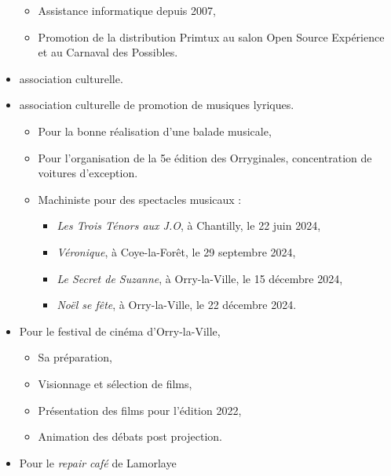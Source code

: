 \begin{itemize}
\begin{itemize}
                \item{Assistance informatique depuis 2007,}
                \item{Promotion de la distribution Primtux au salon Open Source Expérience et au Carnaval des Possibles.}
            \end{itemize}
        \item{ association culturelle.}
        \item{ association culturelle de promotion de musiques lyriques.}
            \begin{itemize}
                \item{Pour la bonne réalisation d'une balade musicale,}
                \item{Pour l'organisation de la 5e édition des Orryginales, concentration de voitures d'exception.}
                \item{Machiniste pour des spectacles musicaux :}
                    \begin{itemize}
                        \item{\textit{Les Trois Ténors aux J.O}, à Chantilly, le 22 juin 2024,}
                        \item{\textit{Véronique}, à Coye-la-Forêt, le 29 septembre 2024,}
                        \item{\textit{Le Secret de Suzanne}, à Orry-la-Ville, le 15 décembre 2024,}
                        \item{\textit{Noël se fête}, à Orry-la-Ville, le 22 décembre 2024.}
                    \end{itemize}
            \end{itemize}
        \item{Pour le festival de cinéma  d’Orry-la-Ville,}
            \begin{itemize}
                \item{Sa préparation,}
                \item{Visionnage et sélection de films,}
                \item{Présentation des films pour l'édition 2022,}
                \item{Animation des débats post projection.}
            \end{itemize}
        \item{Pour le \textit{repair café}  de Lamorlaye}

\end{itemize}
